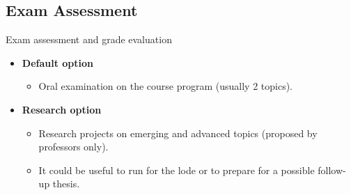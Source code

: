 \documentclass[xcolor=x11names,compress,10pt,unknownkeysallowed,aspectratio=169]{beamer}
\begin{document}
\subsection{Exam Assessment}
\begin{frame}{Exam assessment and grade evaluation}
\begin{itemize}\justifying
		
	\vspace{0.3cm}
	\item \alert{\textbf{Default option}}
	\small{
		\begin{itemize}\justifying
			\vspace{0.1cm}
			\item[$-$] \alert{Oral} examination on the course program (usually 2 topics).
			
		\end{itemize}
	}\normalsize

	\vspace{0.6cm}
	\item \alert{\textbf{Research option}}
	\small{
		\begin{itemize}\justifying
			\vspace{0.1cm}
			\item[$-$] \alert{Research projects} on emerging and advanced topics (proposed by professors only).

			\vspace{0.1cm}
			\item[$-$] It could be useful to run for the \alert{lode} or to prepare for a possible follow-up \alert{thesis}.
		\end{itemize}
	}\normalsize	
\end{itemize}

\end{frame}
%
\end{document}
